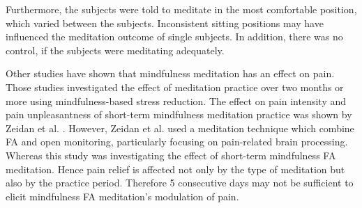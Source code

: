 Furthermore, the subjects were told to meditate in the most comfortable position, which varied between the subjects. Inconsistent sitting positions may have influenced the meditation outcome of single subjects. In addition, there was no control, if the subjects were meditating adequately.

Other studies have shown that mindfulness meditation has an effect on pain. Those studies investigated the effect of meditation practice over two months or more using mindfulness-based stress reduction. \cite{Kabat1982,Rosenzweig2010} The effect on pain intensity and pain unpleasantness of short-term mindfulness meditation practice was shown by Zeidan et al. \cite{Zeidan2012}. However, Zeidan et al. \cite{Zeidan2012} used a meditation technique which combine FA and open monitoring, particularly focusing on pain-related brain processing. Whereas this study was investigating the effect of short-term mindfulness FA meditation. Hence pain relief is affected not only by the type of meditation but also by the practice period. Therefore 5 consecutive days may not be sufficient to elicit mindfulness FA meditation’s modulation of pain.



